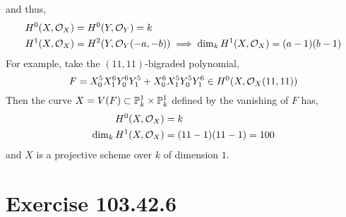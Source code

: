 \documentclass[12pt]{article}
\begin{document}
and thus,
\begin{align*}
H^0(X, \struct{X}) & = H^0(Y, \struct{Y}) = k 
\\
H^1(X, \struct{X}) & = H^2(Y, \struct{Y}(-a,-b)) \implies \dim_k H^1(X, \struct{X}) = (a - 1)(b - 1)
\end{align*}
For example, take the $(11, 11)$-bigraded polynomial,
\[ F = X_0^5 X_1^6 Y_0^6 Y_1^5 + X_0^6 X_1^5 Y_0^5 Y_1^6 \in H^0(X, \struct{X}(11, 11)) \]
Then the curve $X = V(F) \subset \P^1_k \times \P^1_k$ defined by the vanishing of $F$ has,
\begin{align*}
H^0(X, \struct{X}) & = k
\\
\dim_k H^1(X, \struct{X}) & = (11 - 1)(11 - 1) = 100 
\end{align*}
and $X$ is a projective scheme over $k$ of dimension $1$. 

\section{Exercise 103.42.6}
\end{document}
